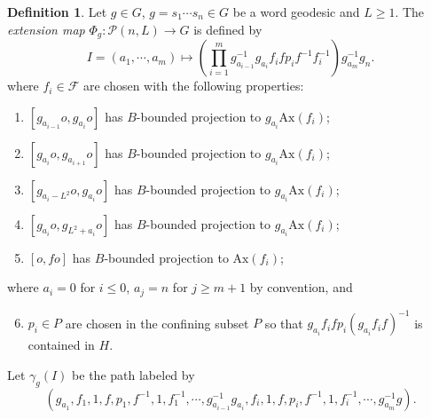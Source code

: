 \documentclass{amsart}
\numberwithin{thm}{section}
\numberwithin{figure}{section}
\theoremstyle{definition}
\theoremstyle{definition}
\newtheorem{defn}[thm]{Definition}
\theoremstyle{remark}
\newcommand{\ax}{\mathrm{Ax}}
\numberwithin{equation}{section}
\theoremstyle{plain}
\begin{document}
\begin{defn}\label{defExtensionMap}
	Let $g \in G$, $g=   s_1 \cdots s_n\in G$ be a word geodesic and $L\ge 1$. The {\it extension map} $\Phi_g: \mathcal P(n,L)\to G$ is  defined by $$I=(a_1, \cdots, a_m)\mapsto \left(\prod_{i=1}^m g_{a_{i-1}}^{-1} g_{a_i} f_i f p_i f^{-1} f_i^{-1}\right) g_{a_{m}}^{-1} g_n.$$
	where $f_i\in \mathcal F$ are chosen with the following properties:
	\begin{enumerate}\label{contrachoice}
		\item\label{prevproj}  $[g_{a_{i-1}} o, g_{a_i} o]$ has $B$-bounded projection to $g_{a_i}\ax(f_i)$;
		\item\label{nextproj} $[g_{a_{i}} o, g_{a_{i+1}} o]$ has $B$-bounded projection to $g_{a_i}\ax(f_i)$;
		\item\label{prevLproj} $[g_{a_{i} - L^2} o, g_{a_{i}} o]$ has $B$-bounded projection to $g_{a_i}\ax(f_i)$;
		\item\label{nextLproj} $[g_{a_{i}} o, g_{L^2 + a_{i}} o]$ has $B$-bounded projection to $g_{a_i}\ax(f_i)$;
        \item\label{fproj} $[o, f o]$ has $B$-bounded projection to $\ax(f_i)$;
	\end{enumerate}
	where    $a_i = 0$ for $i\le 0$, $a_{j} = n$ for $j\ge m+1$ by convention, and
	\begin{enumerate}\setcounter{enumi}{5}\label{confinedchoice} 
		\item $p_i\in P$ are chosen in the confining subset $P$ so that $g_{a_i}f_i f p_i(g_{a_i}f_if)^{-1}$ is contained in $H$.
	\end{enumerate} 
	
	Let $\gamma_g(I)$ be the path labeled by $$(g_{a_1}, f_1,1, f, p_1, f^{-1}, 1, f_1^{-1}, \cdots, g_{a_{i-1}}^{-1} g_{a_i}, f_i, 1, f, p_i, f^{-1}, 1, f_i^{-1}, \cdots, g_{a_{m}}^{-1} g).$$
\end{defn}
\end{document}
